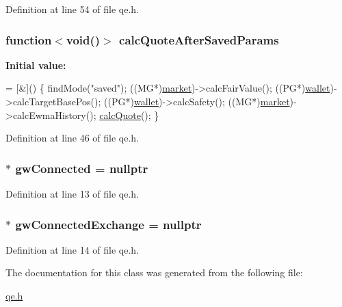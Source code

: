 Definition at line 54 of file qe.\+h.

\subsubsection[{\texorpdfstring{calc\+Quote\+After\+Saved\+Params}{calcQuoteAfterSavedParams}}]{\setlength{\rightskip}{0pt plus 5cm}function$<$void()$>$ calc\+Quote\+After\+Saved\+Params}\hypertarget{class_k_1_1_q_e_ad94592f5065d0e45c53b88f97036639a}{}\label{class_k_1_1_q_e_ad94592f5065d0e45c53b88f97036639a}
{\bfseries Initial value\+:}
\begin{DoxyCode}
= [&]() \{
        findMode(\textcolor{stringliteral}{"saved"});
        ((MG*)\hyperlink{class_k_1_1_klass_a98dbde943a8c48f1f266b879e5409777}{market})->calcFairValue();
        ((PG*)\hyperlink{class_k_1_1_klass_a5943d9c958085108c746fdc756c7aad3}{wallet})->calcTargetBasePos();
        ((PG*)\hyperlink{class_k_1_1_klass_a5943d9c958085108c746fdc756c7aad3}{wallet})->calcSafety();
        ((MG*)\hyperlink{class_k_1_1_klass_a98dbde943a8c48f1f266b879e5409777}{market})->calcEwmaHistory();
        \hyperlink{class_k_1_1_q_e_a7fa74fffe521ea33c7a4c9deaa606994}{calcQuote}();
      \}
\end{DoxyCode}


Definition at line 46 of file qe.\+h.

\subsubsection[{\texorpdfstring{gw\+Connected}{gwConnected}}]{$\ast$ gw\+Connected = nullptr}\hypertarget{class_k_1_1_q_e_a572945fdb3d861b6c685f6c5af9f1376}{}\label{class_k_1_1_q_e_a572945fdb3d861b6c685f6c5af9f1376}


Definition at line 13 of file qe.\+h.

\subsubsection[{\texorpdfstring{gw\+Connected\+Exchange}{gwConnectedExchange}}]{ $\ast$ gw\+Connected\+Exchange = nullptr}\hypertarget{class_k_1_1_q_e_a6d9ed4a9793ac810eca371568ee912d3}{}\label{class_k_1_1_q_e_a6d9ed4a9793ac810eca371568ee912d3}


Definition at line 14 of file qe.\+h.



The documentation for this class was generated from the following file\+:\begin{DoxyCompactItemize}
\item 
\hyperlink{qe_8h}{qe.\+h}\end{DoxyCompactItemize}
